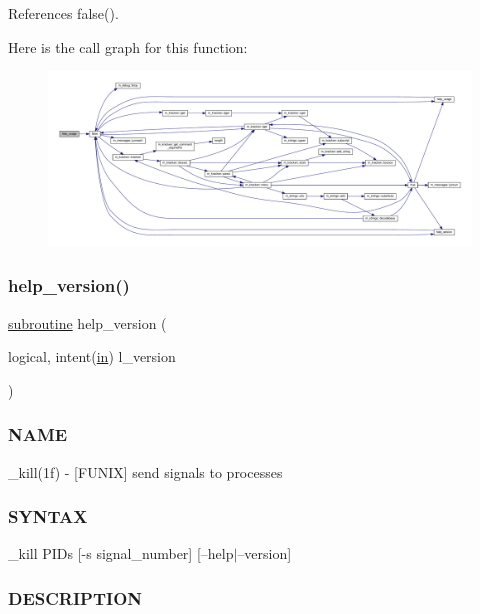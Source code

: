References false().

Here is the call graph for this function\+:
\nopagebreak
\begin{figure}[H]
\begin{center}
\leavevmode
\includegraphics[width=350pt]{__kill_8f90_a3e09a3b52ee8fb04eeb93fe5761626a8_cgraph}
\end{center}
\end{figure}
\mbox{\label{__kill_8f90_a39c21619b08a3c22f19e2306efd7f766}} 
\subsubsection{\texorpdfstring{help\+\_\+version()}{help\_version()}}
{\footnotesize\ttfamily \hyperlink{M__stopwatch_83_8txt_acfbcff50169d691ff02d4a123ed70482}{subroutine} help\+\_\+version (\begin{DoxyParamCaption}\item[{logical, intent(\hyperlink{M__journal_83_8txt_afce72651d1eed785a2132bee863b2f38}{in})}]{l\+\_\+version }\end{DoxyParamCaption})}



\subsubsection*{N\+A\+ME}

\+\_\+kill(1f) -\/ \mbox{[}F\+U\+N\+IX\mbox{]} send signals to processes \subsubsection*{S\+Y\+N\+T\+AX}

\+\_\+kill P\+I\+Ds \mbox{[}-\/s signal\+\_\+number\mbox{]} \mbox{[}--help$\vert$--version\mbox{]} \subsubsection*{D\+E\+S\+C\+R\+I\+P\+T\+I\+ON}


